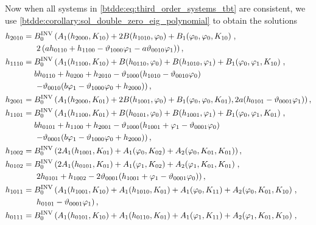 Now when all systems in \cref{btdde:eq:third_order_systems_tbt} are consistent,
we use \cref{btdde:corollary:sol_double_zero_eig_polynomial} to obtain the solutions
\begin{equation}
\label{btdde:eq:third_order_systems_solutions_tbt}
\begin{aligned}
h_{2010} ={}& \BINV 0 \left(A_1(h_{2000},K_{10})+ 2 B(h_{1010},\phi_0) + B_1(\phi_0,\phi_0,K_{10}) \right., \\
            & \left. 2 \left(a h_{0110} + h_{1100} - \vartheta_{1000} \phi_1 - a \vartheta_{0010} \phi_1   \right)\right), \\
h_{1110} ={}& \BINV 0 \left(A_1(h_{1100},K_{10}) + B(h_{0110},\phi_0) + B(h_{1010},\phi_1) + B_1(\phi_0,\phi_1,K_{10})\right., \\
            & b h_{0110} + h_{0200} + h_{2010} - \vartheta_{1000} (h_{1010} - \vartheta_{0010} \phi_0) \\
            & \left. - \vartheta_{0010} (b \phi_1 - \vartheta_{1000} \phi_0 + h_{2000})  \right), \\
h_{2001} ={}& \BINV 0 \left( A_1(h_{2000},K_{01}) + 2 B(h_{1001},\phi_0) + B_1(\phi_0,\phi_0,K_{01}), 2 a (h_{0101} - \vartheta_{0001} \phi_1) \right), \\
h_{1101} ={}& \BINV 0 \left(A_1(h_{1100},K_{01}) + B(h_{0101},\phi_0) + B(h_{1001},\phi_1) + B_1(\phi_0,\phi_1,K_{01})\right., \\
            & b h_{0101} + h_{1100} + h_{2001} - \vartheta_{1000} (h_{1001} + \phi_1 - \vartheta_{0001} \phi_0) \\
            & \left. - \vartheta_{0001} (b \phi_1 - \vartheta_{1000} \phi_0 + h_{2000}) \right), \\
h_{1002} ={}& \BINV 0 \left(2 A_1(h_{1001},K_{01}) + A_1(\phi_0,K_{02}) + A_2(\phi_0,K_{01},K_{01})\right), \\
h_{0102} ={}& \BINV 0 \left(2 A_1(h_{0101},K_{01}) + A_1(\phi_1,K_{02}) + A_2(\phi_1,K_{01},K_{01})\right., \\
            & \left. 2 h_{0101} + h_{1002} - 2 \vartheta_{0001} (h_{1001} + \phi_1 - \vartheta_{0001} \phi_0) \right), \\
h_{1011} ={}& \BINV 0 \left(A_1(h_{1001},K_{10}) + A_1(h_{1010},K_{01}) + A_1(\phi_0,K_{11}) + A_2(\phi_0,K_{01},K_{10})\right., \\
            & \left. h_{0101} - \vartheta_{0001} \phi_1\right), \\
h_{0111} ={}& \BINV 0 \left(A_1(h_{0101},K_{10}) + A_1(h_{0110},K_{01}) + A_1(\phi_1,K_{11}) + A_2(\phi_1,K_{01},K_{10})\right., \\

\end{aligned}
\end{equation}
